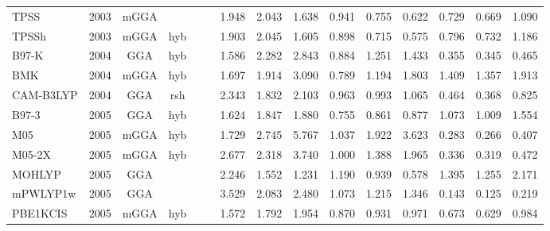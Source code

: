 \begin{landscape}
\begin{longtable}{lc:cccc:rrr:rrr:rrr}
    TPSS             & 2003 & mGGA &          &             &           & 1.948             & 2.043             & 1.638  & 0.941              & 0.755             & 0.622  & 0.729   & 0.669 & 1.090 \\
    TPSSh            & 2003 & mGGA & hyb      &             &           & 1.903             & 2.045             & 1.605  & 0.898              & 0.715             & 0.575  & 0.796   & 0.732 & 1.186 \\
    B97-K            & 2004 & GGA  & hyb      &             &           & 1.586             & 2.282             & 2.843  & 0.884              & 1.251             & 1.433  & 0.355   & 0.345 & 0.465 \\
    BMK              & 2004 & mGGA & hyb      &             &           & 1.697             & 1.914             & 3.090  & 0.789              & 1.194             & 1.803  & 1.409   & 1.357 & 1.913 \\
    CAM-B3LYP        & 2004 & GGA  & rsh      &             &           & 2.343             & 1.832             & 2.103  & 0.963              & 0.993             & 1.065  & 0.464   & 0.368 & 0.825 \\
    B97-3            & 2005 & GGA  & hyb      &             &           & 1.624             & 1.847             & 1.880  & 0.755              & 0.861             & 0.877  & 1.073   & 1.009 & 1.554 \\
    M05              & 2005 & mGGA & hyb      &             &           & 1.729             & 2.745             & 5.767  & 1.037              & 1.922             & 3.623  & 0.283   & 0.266 & 0.407 \\
    M05-2X           & 2005 & mGGA & hyb      &             &           & 2.677             & 2.318             & 3.740  & 1.000              & 1.388             & 1.965  & 0.336   & 0.319 & 0.472 \\
    MOHLYP           & 2005 & GGA  &          &             &           & 2.246             & 1.552             & 1.231  & 1.190              & 0.939             & 0.578  & 1.395   & 1.255 & 2.171 \\
    mPWLYP1w         & 2005 & GGA  &          &             &           & 3.529             & 2.083             & 2.480  & 1.073              & 1.215             & 1.346  & 0.143   & 0.125 & 0.219 \\
    PBE1KCIS         & 2005 & mGGA & hyb      &             &           & 1.572             & 1.792             & 1.954  & 0.870              & 0.931             & 0.971  & 0.673   & 0.629 & 0.984 \\

\end{longtable}
\end{landscape}
